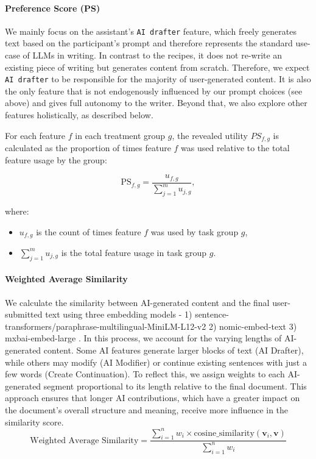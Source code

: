 \paragraph{\textbf{Preference Score (PS)}}
We mainly focus on the assistant's \texttt{AI drafter} feature, which freely generates text based on the participant's prompt and therefore represents the standard use-case of LLMs in writing. In contrast to the recipes, it does not re-write an existing piece of writing but generates content from scratch. Therefore, we expect \texttt{AI drafter} to be responsible for the majority of user-generated content. It is also the only feature that is not endogenously influenced by our prompt choices (see above) and gives full autonomy to the writer. Beyond that, we also explore other features holistically, as described below.

For each feature $f$ in each treatment group $g$,  the revealed utility $PS_{f,g}$ is calculated as the proportion of times feature $f$ was used relative to the total feature usage by the group:

\[
\text{PS}_{f,g} = \frac{u_{f,g}}{\sum_{j=1}^{m} u_{j,g}},
\]

where:
\begin{itemize}
    \item $u_{f,g}$ is the count of times feature $f$ was used by task group $g$,
    \item $\sum_{j=1}^{m} u_{j,g}$ is the total feature usage in task group $g$.
\end{itemize}

\paragraph{\textbf{Weighted Average Similarity}}
We calculate the similarity between AI-generated content and the final user-submitted text using three embedding models - 1) sentence-transformers/paraphrase-multilingual-MiniLM-L12-v2 \cite{reimers2019sentencebertsentenceembeddingsusing} 2) nomic-embed-text \cite{nussbaum2024nomic} 3) mxbai-embed-large \cite{li2023angle}. In this process, we account for the varying lengths of AI-generated content. Some AI features generate larger blocks of text (AI Drafter), while others may modify (AI Modifier) or continue  existing sentences with just a few words (Create Continuation). To reflect this, we assign weights to each AI-generated segment proportional to its length relative to the final document. This approach ensures that longer AI contributions, which have a greater impact on the document's overall structure and meaning, receive more influence in the similarity score.
\[
\text{Weighted Average Similarity} = \frac{\sum_{i=1}^{n} w_i \times \text{cosine\_similarity}(\mathbf{v}_i, \mathbf{v})}{\sum_{i=1}^{n} w_i}
\]

